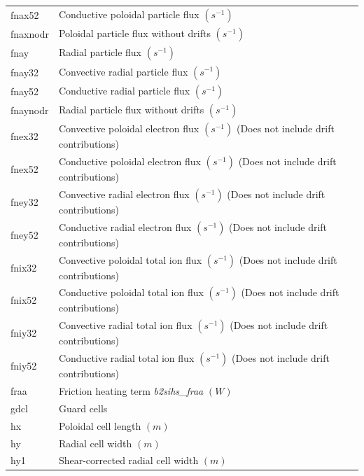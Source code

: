 \documentclass[a4paper,10pt]{report}
\begin{document}
\begin{center}
\begin{longtable}{|l|l|}
    fnax52   & \index{b2plot, fnax52} Conductive poloidal particle flux $(s^{-1})$ \\
    fnaxnodr & \index{b2plot, fnaxnodr} Poloidal particle flux without drifts $(s^{-1})$ \\
    fnay     & \index{b2plot, fnay} Radial particle flux $(s^{-1})$ \\
    fnay32   & \index{b2plot, fnay32} Convective radial particle flux $(s^{-1})$ \\
    fnay52   & \index{b2plot, fnay52} Conductive radial particle flux $(s^{-1})$ \\
    fnaynodr & \index{b2plot, fnaynodr} Radial particle flux without drifts $(s^{-1})$ \\
    fnex32   & \index{b2plot, fnex32} Convective poloidal electron flux $(s^{-1})$ (Does not include drift contributions) \\
    fnex52   & \index{b2plot, fnex52} Conductive poloidal electron flux $(s^{-1})$ (Does not include drift contributions) \\
    fney32   & \index{b2plot, fney32} Convective radial electron flux $(s^{-1})$ (Does not include drift contributions) \\
    fney52   & \index{b2plot, fney52} Conductive radial electron flux $(s^{-1})$ (Does not include drift contributions) \\
    fnix32   & \index{b2plot, fnix32} Convective poloidal total ion flux $(s^{-1})$ (Does not include drift contributions) \\
    fnix52   & \index{b2plot, fnix52} Conductive poloidal total ion flux $(s^{-1})$ (Does not include drift contributions) \\
    fniy32   & \index{b2plot, fniy32} Convective radial total ion flux $(s^{-1})$ (Does not include drift contributions) \\
    fniy52   & \index{b2plot, fniy52} Conductive radial total ion flux $(s^{-1})$ (Does not include drift contributions) \\
    fraa     & \index{b2plot, fraa} Friction heating term {\em b2sihs\_fraa} $(W)$ \\
    gdcl     & \index{b2plot, gdcl} Guard cells \\
    hx       & \index{b2plot, hx} Poloidal cell length $(m)$ \\
    hy       & \index{b2plot, hy} Radial cell width $(m)$ \\
    hy1      & \index{b2plot, hy1} Shear-corrected radial cell width $(m)$ \\

\end{longtable}
\end{center}
\end{document}
